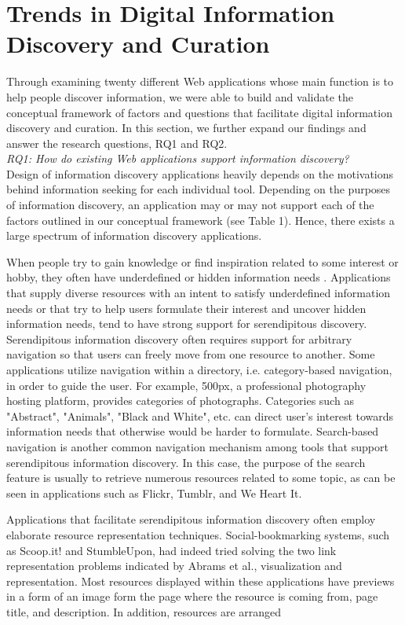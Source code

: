 \documentclass{casconpaper}
\begin{document}
{\section{Trends in Digital Information Discovery and Curation}

Through examining twenty different Web applications whose main function is to help people discover information, we were able to build and validate the conceptual framework of factors and questions that facilitate digital information discovery and curation. In this section, we further expand our findings and answer the research questions, RQ1 and RQ2. \\

\emph{RQ1: How do existing Web applications support information discovery?} \\

Design of information discovery applications heavily depends on the motivations behind information seeking for each individual tool. Depending on the purposes of information discovery, an application may or may not support each of the factors outlined in our conceptual framework (see Table 1). Hence, there exists a large spectrum of information discovery applications.

When people try to gain knowledge or find inspiration related to some interest or hobby, they often have underdefined or hidden information needs \cite{lindley}. Applications that supply diverse resources with an intent to satisfy underdefined information needs or that try to help users formulate their interest and uncover hidden information needs, tend to have strong support for serendipitous discovery. Serendipitous information discovery often requires support for arbitrary navigation so that users can freely move from one resource to another. Some applications utilize navigation within a directory, i.e. category-based navigation, in order to guide the user. For example, 500px, a professional photography hosting platform, provides categories of photographs. Categories such as "Abstract", "Animals", "Black and White", etc. can direct user's interest towards information needs that otherwise would be harder to formulate. Search-based navigation is another common navigation mechanism among tools that support serendipitous information discovery. In this case, the purpose of the search feature is usually to retrieve numerous resources related to some topic, as can be seen in applications such as Flickr, Tumblr, and We Heart It. 

Applications that facilitate serendipitous information discovery often employ elaborate resource representation techniques. Social-bookmarking systems, such as Scoop.it! and StumbleUpon, had indeed tried solving the two link representation problems indicated by Abrams et al.\cite{abrams}, visualization and representation.  Most resources displayed within these applications have previews in a form of an image form the page where the resource is coming from, page title, and description. In addition, resources are arranged 

}
\end{document}
